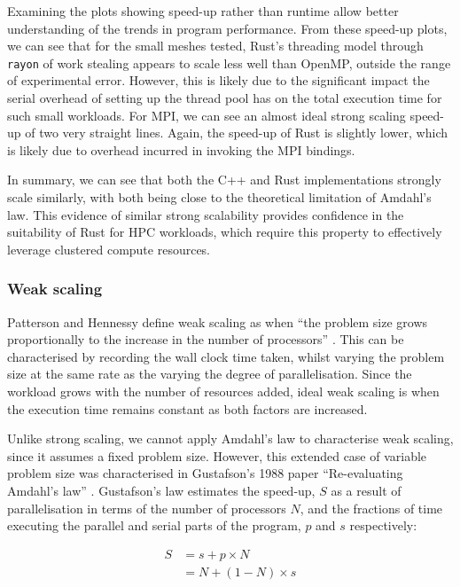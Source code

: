 Examining the plots showing speed-up rather than runtime allow better understanding of the trends in program performance. From these speed-up plots, we can see that for the small meshes tested, Rust's threading model through \texttt{rayon} of work stealing appears to scale less well than OpenMP, outside the range of experimental error. However, this is likely due to the significant impact the serial overhead of setting up the thread pool has on the total execution time for such small workloads. For MPI, we can see an almost ideal strong scaling speed-up of two very straight lines. Again, the speed-up of Rust is slightly lower, which is likely due to overhead incurred in invoking the MPI bindings.

In summary, we can see that both the C++ and Rust implementations strongly scale similarly, with both being close to the theoretical limitation of Amdahl's law. This evidence of similar strong scalability provides confidence in the suitability of Rust for \acrshort{HPC} workloads, which require this property to effectively leverage clustered compute resources.

\subsubsection{Weak scaling}
\label{sssec:weak-scaling}

Patterson and Hennessy define weak scaling as when ``the problem size grows proportionally to the increase in the number of processors'' \cite{pattersonHennessyComputerOrganisationArchitecture}. This can be characterised by recording the wall clock time taken, whilst varying the problem size at the same rate as the varying the degree of parallelisation. Since the workload grows with the number of resources added, ideal weak scaling is when the execution time remains constant as both factors are increased.

Unlike strong scaling, we cannot apply Amdahl's law to characterise weak scaling, since it assumes a fixed problem size. However, this extended case of variable problem size was characterised in Gustafson's 1988 paper ``Re-evaluating Amdahl's law'' \cite{gustafsonReevaluatingAmdahlLaw1988}. Gustafson's law estimates the speed-up, $S$ as a result of parallelisation in terms of the number of processors $N$, and the fractions of time executing the parallel and serial parts of the program, $p$ and $s$ respectively:

\begin{align}
    S &= s + p \times N \\
      &= N + (1 - N) \times s
\end{align}

